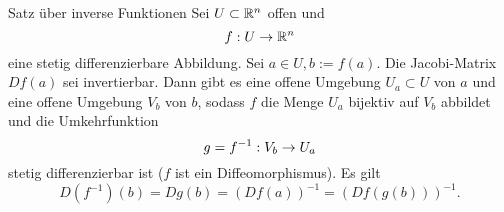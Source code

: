 \documentclass[main.tex]{subfiles}
\begin{document}
\begin{karte}{Satz über inverse Funktionen}
    Sei \( U \subset \mathbb{R}^n \) offen und 
    \[ f : U \rightarrow \mathbb{R}^n \]
    eine stetig differenzierbare Abbildung. Sei 
    \( a\in U, b:=f(a) \). Die Jacobi-Matrix 
    \( Df(a) \) sei invertierbar. Dann gibt es eine 
    offene Umgebung \( U_a \subset U \) von \(a\) und 
    eine offene Umgebung \( V_b \) von \(b\), sodass 
    \(f\) die Menge \( U_a \) bijektiv auf \(V_b\) 
    abbildet und die Umkehrfunktion
    \[ g=f^{-1} : V_b \rightarrow U_a \]
    stetig differenzierbar ist (\(f\) ist ein 
    Diffeomorphismus). Es gilt 
    \[ D(f^{-1})(b) = Dg(b) = (Df(a))^{-1} = (Df(g(b)))^{-1}. \]
\end{karte}
\end{document}
